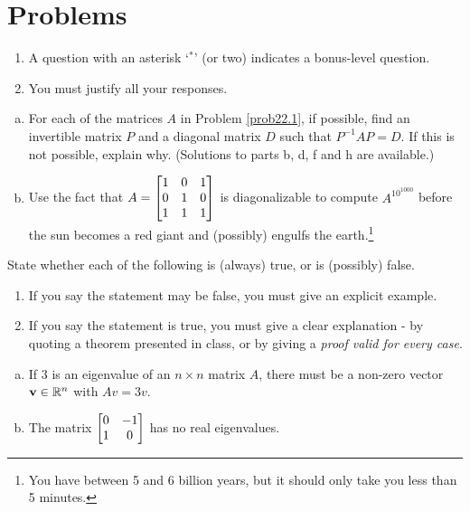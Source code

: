 \section*{Problems}

 


\begin{enumerate}
\item A question with an asterisk `$ ^\ast$' (or two) indicates a bonus-level question.
 \item You must justify all your responses.
\end{enumerate}
\bigskip


\begin{prob} \label{prob23.1} 
\begin{enumerate}[a)]
\item For each of the matrices $A$  in Problem \ref{prob22.1}, if possible, find an invertible matrix $P$ and a diagonal matrix $D$ such that $P^{-1}AP =D$. If this is not possible, explain why. (Solutions to parts b, d, f and h are available.) 

\item Use the fact that $A=\bmatrix 
1&0&1\\0&1&0\\1&1&1 \endbmatrix $ is diagonalizable to compute  $A^{10^{1000}}$ before the sun becomes a red giant and (possibly) engulfs the earth.\footnote{You have between 5 and 6 billion years, but it should only take you less than 5 minutes.} 

\end{enumerate}

 

\end{prob} \begin{prob} \label{prob23.2} State whether each of the following is (always) true,
or is (possibly) false.     
   \smallskip    
\begin{enumerate}[$\bullet$]
\item If you say the statement may be false, you must give an explicit example.   
\item If you say the statement is true, you must give a clear explanation -   by quoting a theorem presented in class, or by giving a {\it proof valid for every  case}. 
\end{enumerate}

\begin{enumerate}[a)]
\item If $3$ is an eigenvalue of an $n \times n$ matrix $A$, there must be a non-zero vector $\mathbf{v} \in \mathbb{R}^n$ with $Av=3v$.
\medskip
%
\item\sov The matrix $\bmatrix 0&-1\\1&0\endbmatrix$ has no real eigenvalues.
\medskip
%


\end{enumerate}
\end{prob}

